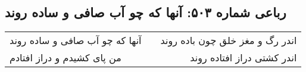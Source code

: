 \begin{center}
\section*{رباعی شماره ۵۰۳: آنها که چو آب صافی و ساده روند}
\label{sec:0503}
\begin{longtable}{l p{0.5cm} r}
آنها که چو آب صافی و ساده روند
&&
اندر رگ و مغز خلق چون باده روند
\\
من پای کشیدم و دراز افتادم
&&
اندر کشتی دراز افتاده روند
\\
\end{longtable}
\end{center}
